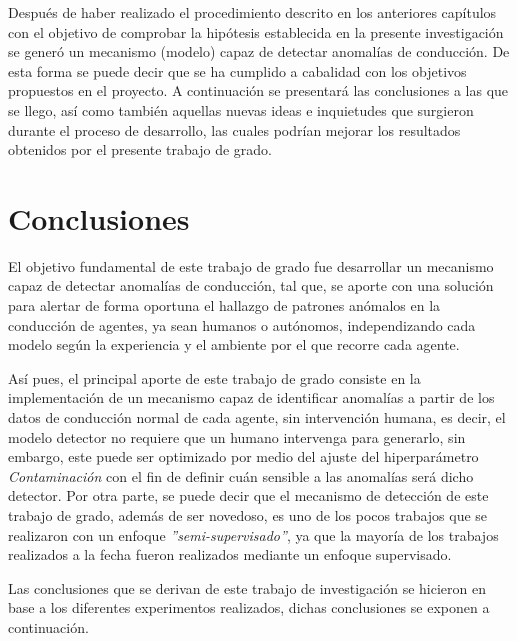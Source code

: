 Despu\'{e}s de haber realizado el procedimiento descrito en los anteriores cap\'{i}tulos con el objetivo de comprobar la hip\'{o}tesis establecida en la presente investigaci\'{o}n se gener\'{o} un mecanismo (modelo) capaz de detectar anomal\'{i}as de conducci\'{o}n. De esta forma se puede decir que se ha cumplido a cabalidad con los objetivos propuestos en el proyecto. A continuaci\'{o}n se presentar\'{a} las conclusiones a las que se llego, as\'{i} como tambi\'{e}n aquellas nuevas ideas e inquietudes que surgieron durante el proceso de desarrollo, las cuales podr\'{i}an mejorar los resultados obtenidos por el presente trabajo de grado.

\section{Conclusiones}

El objetivo fundamental de este trabajo de grado fue desarrollar un mecanismo capaz de detectar anomal\'{i}as de conducci\'{o}n, tal que, se aporte con una soluci\'{o}n para alertar de forma oportuna el hallazgo de patrones an\'{o}malos en la conducci\'{o}n de agentes, ya sean humanos o aut\'{o}nomos, independizando cada modelo seg\'{u}n la experiencia y el ambiente por el que recorre cada agente.

\vspace{5mm} %

As\'{i} pues, el principal aporte de este trabajo de grado consiste en la implementaci\'{o}n de un mecanismo capaz de identificar anomal\'{i}as a partir de los datos de conducci\'{o}n normal de cada agente, sin intervenci\'{o}n humana, es decir, el modelo detector no requiere que un humano intervenga para generarlo, sin embargo, este puede ser optimizado por medio del ajuste del hiperpar\'{a}metro \textit{Contaminaci\'{o}n} con el fin de definir cu\'{a}n sensible a las anomal\'{i}as ser\'{a} dicho detector. Por otra parte, se puede decir que el mecanismo de detecci\'{o}n de este trabajo de grado, adem\'{a}s de ser novedoso, es uno de los pocos trabajos que se realizaron con un enfoque \textit{''semi-supervisado''}, ya que la mayor\'{i}a de los trabajos realizados a la fecha fueron realizados mediante un enfoque supervisado.

\vspace{5mm} %

Las conclusiones que se derivan de este trabajo de investigaci\'{o}n se hicieron en base a los diferentes experimentos realizados, dichas conclusiones se exponen a continuaci\'{o}n.

